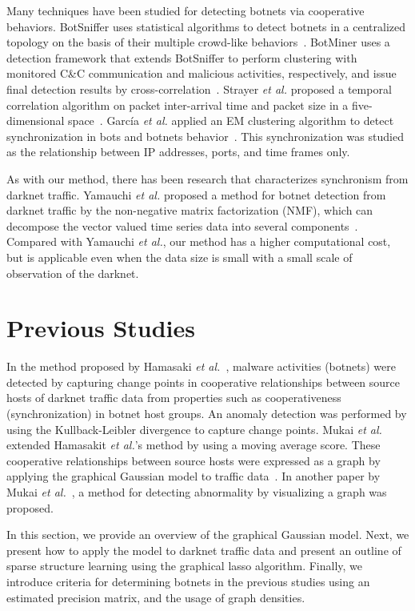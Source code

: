 \documentclass[letterpaper]{sig-alternate-10pt}
\begin{document}
Many techniques have been studied for detecting botnets via cooperative behaviors.
BotSniffer uses statistical algorithms to detect botnets in a centralized topology on the basis of their multiple crowd-like behaviors~\cite{Gu}.
BotMiner uses a detection framework that extends BotSniffer to perform clustering with monitored C\&C communication and malicious activities, respectively, and issue final detection results by cross-correlation~\cite{Gu2}.
Strayer {\it et al.} proposed a temporal correlation algorithm on packet inter-arrival time and packet size in a five-dimensional space~\cite{Strayer}.
Garc\'{i}a {\it et al.} applied an EM clustering algorithm to detect synchronization in bots and botnets behavior~\cite{Garcia2}. This synchronization was studied as the relationship between IP addresses, ports, and time frames only.

As with our method, there has been research that characterizes synchronism from darknet traffic.
Yamauchi {\it et al.} proposed a method for botnet detection from darknet traffic by the non-negative matrix factorization (NMF), which can decompose the vector valued time series data into several components~\cite{Yamauchi}.
Compared with Yamauchi {\it et al.}, our method has a higher computational cost, but is applicable even when the data size is small with a small scale of observation of the darknet.


\section{Previous Studies}
In the method proposed by Hamasaki {\it et al.}~\cite{Hamasaki}, malware activities (botnets) were detected by capturing change points in cooperative relationships between source hosts of darknet traffic data from properties such as cooperativeness (synchronization) in botnet host groups.
An anomaly detection was performed by using the Kullback-Leibler divergence to capture change points.
Mukai {\it et al.}~\cite{Mukai1} extended Hamasakit {\it et al.}'s method by using a moving average score.
These cooperative relationships between source hosts were expressed as a graph by applying the graphical Gaussian model to traffic data~\cite{Ide}.
In another paper by Mukai {\it et al.}~\cite{Mukai2}, a method for detecting abnormality by visualizing a graph was proposed.

In this section, we provide an overview of the graphical Gaussian model.
Next, we present how to apply the model to darknet traffic data and present an outline of sparse structure learning using the graphical lasso algorithm.
Finally, we introduce criteria for determining botnets in the previous studies using an estimated precision matrix, and the usage of graph densities.
\end{document}
